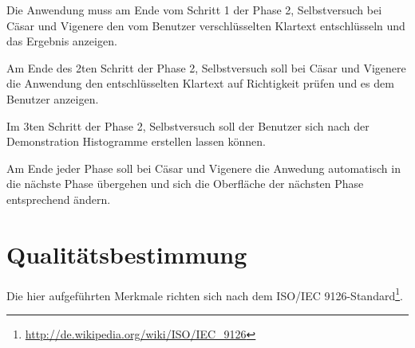 \documentclass{article}
\begin{document}
\begin{T}[start = 90]
 \item Die Anwendung muss am Ende vom Schritt 1 der Phase 2, Selbstversuch bei Cäsar und Vigenere den vom 
       Benutzer verschlüsselten Klartext entschlüsseln und das Ergebnis anzeigen.
\end{T}

\begin{T}[start = 100]
 \item Am Ende des 2ten Schritt der Phase 2, Selbstversuch soll bei Cäsar und Vigenere die Anwendung den entschlüsselten Klartext 
       auf Richtigkeit prüfen und es dem Benutzer anzeigen.
\end{T}

\begin{T}[start = 110]
 \item Im 3ten Schritt der Phase 2, Selbstversuch soll der Benutzer sich nach der Demonstration Histogramme erstellen lassen können.
\end{T}

\begin{T}[start = 120]
 \item Am Ende jeder Phase soll bei Cäsar und Vigenere die Anwedung automatisch in die nächste Phase übergehen und sich die Oberfläche 
       der nächsten Phase entsprechend ändern.
\end{T}

\section{Qualitätsbestimmung}

Die hier aufgeführten Merkmale richten sich nach dem ISO/IEC 9126-Standard\footnote{\url{http://de.wikipedia.org/wiki/ISO/IEC_9126}}.
\end{document}
